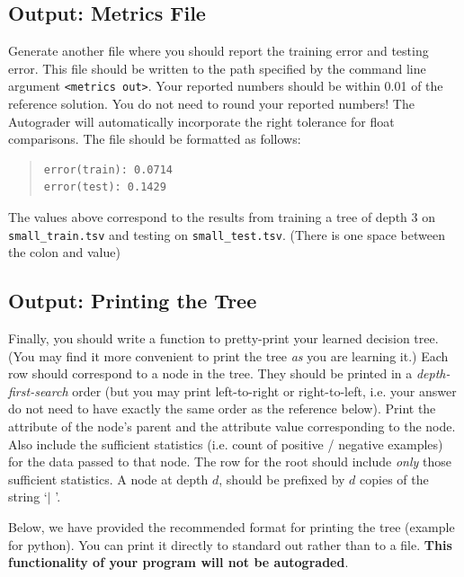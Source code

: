 \documentclass[11pt,addpoints,answers]{exam}
\begin{document}
\subsection{Output: Metrics File}
\label{sec:metrics}

Generate another file where you should report the training error and testing error. This file should be written to the path specified by the command line argument \lstinline{<metrics out>}. Your reported numbers should be within 0.01 of the reference solution. You do not need to round your reported numbers! The Autograder will automatically incorporate the right tolerance for float comparisons. The file should be formatted as follows:

\begin{quote}
\begin{verbatim}
error(train): 0.0714
error(test): 0.1429
\end{verbatim}
\end{quote}

The values above correspond to the results from training a tree of depth 3 on \texttt{small\_train.tsv} and testing on \texttt{small\_test.tsv}. (There is one space between the colon and value)


\subsection{Output: Printing the Tree}
\label{sec:printtree}

Finally, you should write a function to pretty-print your learned decision tree. (You may find it more convenient to print the tree \emph{as} you are learning it.) Each row should correspond to a node in the tree. They should be printed in a \emph{depth-first-search} order (but you may print left-to-right or right-to-left, i.e. your answer do not need to have exactly the same order as the reference below). Print the attribute of the node's parent and the attribute value corresponding to the node. Also include the sufficient statistics (i.e. count of positive / negative examples) for the data passed to that node. The row for the root should include \emph{only} those sufficient statistics. A node at depth $d$, should be prefixed by $d$ copies of the string `$\mid$ '.

Below, we have provided the recommended format for printing the tree (example for python). You can print it directly to standard out rather than to a file. \textbf{This functionality of your program will not be autograded}.
\end{document}
